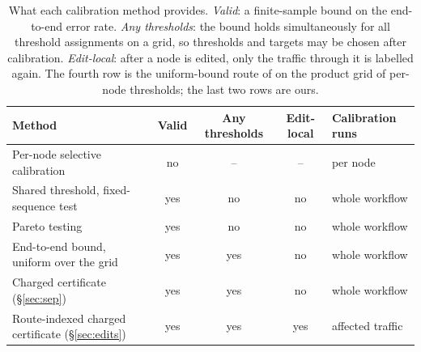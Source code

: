 \documentclass[11pt]{article}
\theoremstyle{definition}
\theoremstyle{remark}
\begin{document}
\begin{table}[t]
\centering\small
\begin{tabular}{lcccl}
\toprule
Method & Valid & Any thresholds & Edit-local & Calibration runs \\
\midrule
Per-node selective calibration & no & -- & -- & per node \\
Shared threshold, fixed-sequence test~\citep{angelopoulos2021ltt} & yes & no & no & whole workflow \\
Pareto testing~\citep{laufer2022pareto} & yes & no & no & whole workflow \\
End-to-end bound, uniform over the grid~\citep{angelopoulos2021ltt} & yes & yes & no & whole workflow \\
Charged certificate (\S\ref{sec:sep}) & yes & yes & no & whole workflow \\
Route-indexed charged certificate (\S\ref{sec:edits}) & yes & yes & yes & affected traffic \\
\bottomrule
\end{tabular}
\caption{What each calibration method provides. \emph{Valid}: a finite-sample bound on the
end-to-end error rate. \emph{Any thresholds}: the bound holds simultaneously for all threshold
assignments on a grid, so thresholds and targets may be chosen after calibration.
\emph{Edit-local}: after a node is edited, only the traffic through it is labelled again.
The fourth row is the uniform-bound route of \citet[\S2.5]{angelopoulos2021ltt} on the product
grid of per-node thresholds; the last two rows are ours.}
\label{tab:properties}
\end{table}
\end{document}
